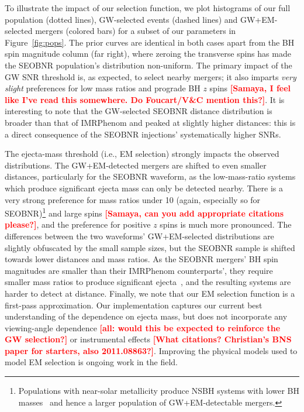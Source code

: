 \documentclass[%
 reprint,
 superscriptaddress,
 nofootinbib,
 amsmath,amssymb,
 aps,
]{revtex4-2}
\newcommand{\smf}[1]{\textcolor{red}{\bf [#1]}}
\begin{document}
To illustrate the impact of our selection function, we plot histograms of our full population (dotted lines), GW-selected events (dashed lines) and GW+EM-selected mergers (colored bars) for a subset of our parameters in Figure~\ref{fig:pops}. The prior curves are identical in both cases apart from the BH spin magnitude column (far right), where zeroing the transverse spins has made the SEOBNR population's distribution non-uniform. The primary impact of the GW SNR threshold is, as expected, to select nearby mergers; it also imparts {\it very slight} preferences for low mass ratios and prograde BH $z$ spins \smf{Samaya, I feel like I've read this somewhere. Do Foucart/V\&C mention this?}. It is interesting to note that the GW-selected SEOBNR distance distribution is broader than that of IMRPhenom and peaked at slightly higher distances: this is a direct consequence of the SEOBNR injections' systematically higher SNRs.

The ejecta-mass threshold (i.e., EM selection) strongly impacts the observed distributions. The GW+EM-detected mergers are shifted to even smaller distances, particularly for the SEOBNR waveform, as the low-mass-ratio systems which produce significant ejecta mass can only be detected nearby. There is a very strong preference for mass ratios under 10 (again, especially so for SEOBNR)\footnote{Populations with near-solar metallicity produce NSBH systems with lower BH masses~\cite{Kruckow_etal:2018} and hence a larger population of GW+EM-detectable mergers.} and large spins \smf{Samaya, can you add appropriate citations please?}, and the preference for positive $z$ spins is much more pronounced. The differences between the two waveforms' GW+EM-selected distributions are slightly obfuscated by the small sample sizes, but the SEOBNR sample is shifted towards lower distances and mass ratios. As the SEOBNR mergers' BH spin magnitudes are smaller than their IMRPhenom counterparts', they require smaller mass ratios to produce significant ejecta~\cite{Foucart_etal:2018}, and the resulting systems are harder to detect at distance. Finally, we note that our EM selection function is a first-pass approximation. Our implementation captures our current best understanding of the dependence on ejecta mass, but does not incorporate any viewing-angle dependence \smf{all: would this be expected to reinforce the GW selection?} or instrumental effects \smf{What citations? Christian's BNS paper for starters, also 2011.08863?}. Improving the physical models used to model EM selection is ongoing work in the field.
\end{document}
